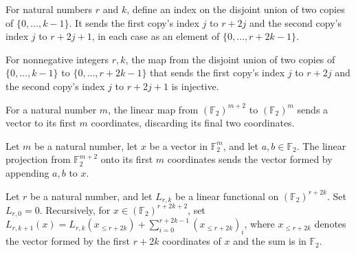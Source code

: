 \begin{definition}
\label{FABL.pairedIndex}
\leanok
{}
For natural numbers $r$ and $k$, define an index on the disjoint union of two copies of
$\{0,\ldots,k-1\}$. It sends the first copy's index $j$ to $r+2j$ and the second copy's
index $j$ to $r+2j+1$, in each case as an element of $\{0,\ldots,r+2k-1\}$.
\end{definition}

\begin{theorem}
\label{FABL.pairedIndex_injective}
\leanok
{}
For nonnegative integers $r,k$, the map from the disjoint union of two copies of
$\{0,\ldots,k-1\}$ to $\{0,\ldots,r+2k-1\}$ that sends the first copy's index $j$ to
$r+2j$ and the second copy's index $j$ to $r+2j+1$ is injective.
\end{theorem}

\begin{definition}
\label{FABL.prefixLastTwoLinearMap}
\leanok
{}
For a natural number $m$, the linear map from $(\mathbb{F}_2)^{m+2}$ to
$(\mathbb{F}_2)^m$ sends a vector to its first $m$ coordinates, discarding its final two
coordinates.
\end{definition}

\begin{theorem}
\label{FABL.prefixLastTwoLinearMap_appendTwo}
\leanok
{}
Let $m$ be a natural number, let $x$ be a vector in $\mathbb{F}_2^m$, and let
$a,b\in\mathbb{F}_2$. The linear projection from $\mathbb{F}_2^{m+2}$ onto its first $m$
coordinates sends the vector formed by appending $a,b$ to $x$.
\end{theorem}

\begin{definition}
\label{FABL.pairedAffineLinearForm}
\leanok
{}
Let $r$ be a natural number, and let $L_{r,k}$ be a linear functional on
$(\mathbb{F}_2)^{r+2k}$. Set $L_{r,0}=0$. Recursively, for
$x\in(\mathbb{F}_2)^{r+2k+2}$, set $L_{r,k+1}(x)=L_{r,k}(x_{\le
r+2k})+\sum_{i=0}^{r+2k-1}(x_{\le r+2k})_i$, where $x_{\le r+2k}$ denotes the vector
formed by the first $r+2k$ coordinates of $x$ and the sum is in $\mathbb{F}_2$.
\end{definition}

